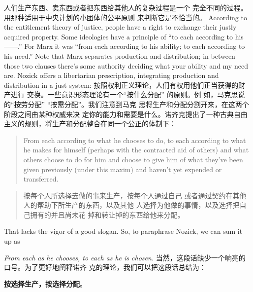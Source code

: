 \begin{paracol}{2}
人们生产东西、卖东西或者把东西给其他人的复杂过程是一个
完全不同的过程。用那种适用于中央计划的小团体的公平原则
来判断它是不恰当的。
\switchcolumn*
According to the entitlement theory of justice, people have a
right to exchange their justly acquired property. Some ideologies have a principle of ``to each according to his------.'' For
Marx it was ``from each according to his ability; to each according to his need.'' Note that Marx separates production and distribution; in between those two clauses there's some authority
deciding what your ability and my need are. Nozick offers a libertarian prescription, integrating production and distribution in a just system:
\switchcolumn
按照权利正义理论，人们有权用他们正当获得的财产进行
交换。一些意识形态理论有一个“按什么分配” 的原则。例
如，马克思说的“按劳分配” “按需分配”。我们注意到马克
思将生产和分配分割开来，在这两个阶段之间由某种权威来决
定你的能力和需要是什么。诺齐克提出了一种古典自由主义的规则，将生产和分配整合在同一个公正的体制下：
\switchcolumn*
\begin{quote}
From each according to what he chooses to do, to each according
to what he makes for himself (perhaps with the contracted aid of
others) and what others choose to do for him and choose to give
him of what they've been given previously (under this maxim)
and haven't yet expended or transferred.
\end{quote}
\switchcolumn
\begin{quote}
按每个人所选择去做的事来生产，按每个人通过自己
或者通过契约在其他人的帮助下所生产的东西，以及其他
人选择为他做的事情，以及选择把自己拥有的并且尚未花
掉和转让掉的东西给他来分配。
\end{quote}
\switchcolumn*
That lacks the vigor of a good slogan. So, to paraphrase Nozick,
we can sum it up as

\textit{\textit{From each as he chooses, to each as he is chosen.}}
\switchcolumn
当然，这段话缺少一个响亮的口号。为了更好地阐释诺齐
克的理论，我们可以把这段话总结为：

\textbf{\textbf{按选择生产，按选择分配}}。


\end{paracol}
